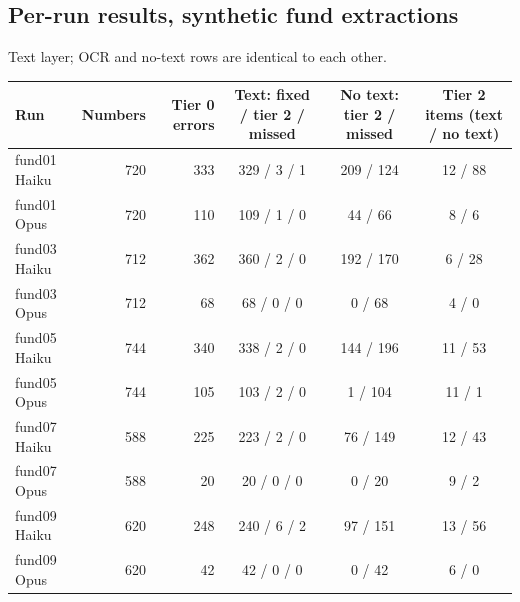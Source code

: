\subsection{Per-run results, synthetic fund extractions}\label{app:runs}

 Text layer; OCR and no-text rows are identical to each other.
\begin{center}
\begin{tabular}{lrrccc}
\toprule
Run & Numbers & Tier 0 errors & Text: fixed / tier 2 / missed & No text: tier 2 / missed & Tier 2 items (text / no text) \\
\midrule
fund01 Haiku & 720 & 333 & 329 / 3 / 1 & 209 / 124 & 12 / 88 \\
fund01 Opus & 720 & 110 & 109 / 1 / 0 & 44 / 66 & 8 / 6 \\
fund03 Haiku & 712 & 362 & 360 / 2 / 0 & 192 / 170 & 6 / 28 \\
fund03 Opus & 712 & 68 & 68 / 0 / 0 & 0 / 68 & 4 / 0 \\
fund05 Haiku & 744 & 340 & 338 / 2 / 0 & 144 / 196 & 11 / 53 \\
fund05 Opus & 744 & 105 & 103 / 2 / 0 & 1 / 104 & 11 / 1 \\
fund07 Haiku & 588 & 225 & 223 / 2 / 0 & 76 / 149 & 12 / 43 \\
fund07 Opus & 588 & 20 & 20 / 0 / 0 & 0 / 20 & 9 / 2 \\
fund09 Haiku & 620 & 248 & 240 / 6 / 2 & 97 / 151 & 13 / 56 \\
fund09 Opus & 620 & 42 & 42 / 0 / 0 & 0 / 42 & 6 / 0 \\
\bottomrule
\end{tabular}
\end{center}

